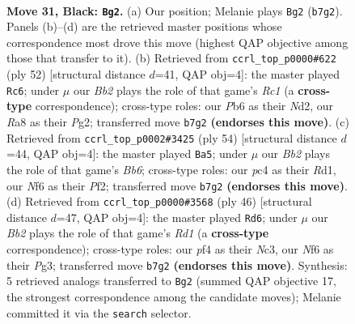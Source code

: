\documentclass[11pt]{article}
\begin{document}
\clearpage

\begin{figure}[p]\centering
\begin{subfigure}{0.46\textwidth}\centering
\resizebox{\linewidth}{!}{%
\newchessgame
\chessboard[
  setfen={r7/pbpp2k1/1p3n2/5p1p/2P2P2/NP6/P2PK2P/R2B4 b - - 1 31},
  showmover=false,
  pgfstyle=straightmove, color=movearrow, markmove={b7-g2}
]}
\caption{}
\end{subfigure}\hfill
\begin{subfigure}{0.46\textwidth}\centering
\resizebox{\linewidth}{!}{%
\newchessgame
\chessboard[
  setfen={3r2k1/p4pp1/b6p/4p3/3pP3/1P5P/P2N1PP1/2R3K1 w - - 0 27},
  showmover=false,
  pgfstyle=straightmove, color=movearrow, markmove={c1-c6}
]}
\caption{}
\end{subfigure}
\\[4pt]
\begin{subfigure}{0.46\textwidth}\centering
\resizebox{\linewidth}{!}{%
\newchessgame
\chessboard[
  setfen={6k1/6bp/pBr3p1/4pp2/2p5/2P4P/PP3PP1/3R2K1 w - - 4 28},
  showmover=false,
  pgfstyle=straightmove, color=movearrow, markmove={b6-a5}
]}
\caption{}
\end{subfigure}\hfill
\begin{subfigure}{0.46\textwidth}\centering
\resizebox{\linewidth}{!}{%
\newchessgame
\chessboard[
  setfen={2b1r1k1/6p1/p1p2p1p/P3p3/8/2N2PP1/4P2P/3R2K1 w - - 0 24},
  showmover=false,
  pgfstyle=straightmove, color=movearrow, markmove={d1-d6}
]}
\caption{}
\end{subfigure}
\caption{\textbf{Move 31, Black: \texttt{Bg2}.} (a) Our position; Melanie plays \texttt{Bg2} (\texttt{b7g2}). Panels (b)--(d) are the retrieved master positions whose correspondence most drove this move (highest QAP objective among those that transfer to it). (b) Retrieved from \texttt{ccrl\_top\_p0000\#622} (ply 52) [structural distance $d$=41, QAP obj=4]: the master played \texttt{Rc6}; under $\mu$ our \emph{Bb2} plays the role of that game's \emph{Rc1} (a \textbf{cross-type} correspondence); cross-type roles: our \emph{P}b6 as their \emph{N}d2, our \emph{R}a8 as their \emph{P}g2; transferred move \texttt{b7g2} \textbf{(endorses this move)}. (c) Retrieved from \texttt{ccrl\_top\_p0002\#3425} (ply 54) [structural distance $d$=44, QAP obj=4]: the master played \texttt{Ba5}; under $\mu$ our \emph{Bb2} plays the role of that game's \emph{Bb6}; cross-type roles: our \emph{p}c4 as their \emph{R}d1, our \emph{N}f6 as their \emph{P}f2; transferred move \texttt{b7g2} \textbf{(endorses this move)}. (d) Retrieved from \texttt{ccrl\_top\_p0000\#3568} (ply 46) [structural distance $d$=47, QAP obj=4]: the master played \texttt{Rd6}; under $\mu$ our \emph{Bb2} plays the role of that game's \emph{Rd1} (a \textbf{cross-type} correspondence); cross-type roles: our \emph{p}f4 as their \emph{N}c3, our \emph{N}f6 as their \emph{P}g3; transferred move \texttt{b7g2} \textbf{(endorses this move)}. Synthesis: 5 retrieved analogs transferred to \texttt{Bg2} (summed QAP objective 17, the strongest correspondence among the candidate moves); Melanie committed it via the \texttt{search} selector.}
\label{fig:thought-m61}
\end{figure}
\end{document}
